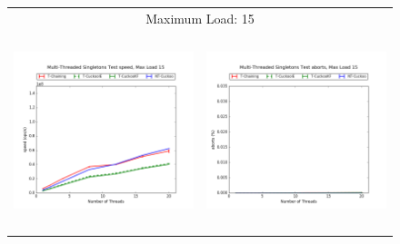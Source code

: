 \begin{figure}[h!]
\begin{tabular}{|cc|}
        \hline 
        \multicolumn{2}{|c|}{{\footnotesize Maximum Load: 15}}\\
        \includegraphics[height=2.25in]{maps/15HM1M:F90,I5,E5speed.png} &
        \includegraphics[height=2.25in]{maps/15HM1M:F90,I5,E5aborts.png}\\
    \hline 
    \end{tabular}
\label{fig:ntqueues}
\end{figure}
